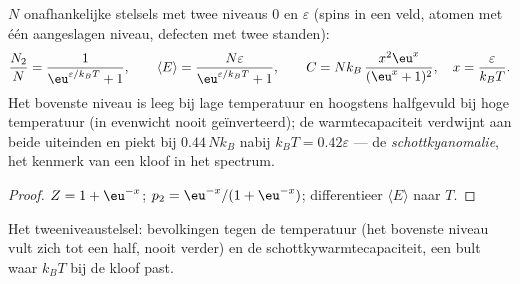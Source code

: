 \begin{proposition}[Tweeniveaustelsel]\label{prop:b2:boltzmann-factor:twolevel}
$N$ onafhankelijke stelsels met twee niveaus $0$ en $\varepsilon$ (spins in een
veld, atomen met één aangeslagen niveau, defecten met twee standen):
\[
\frac{N_2}{N} = \frac{1}{\eu^{\varepsilon/k_BT} + 1}, \qquad
\langle E\rangle = \frac{N\varepsilon}{\eu^{\varepsilon/k_BT} + 1}, \qquad
C = Nk_B\,\frac{x^2\eu^x}{(\eu^x + 1)^2}, \quad x = \frac{\varepsilon}{k_BT} .
\]
Het bovenste niveau is leeg bij lage temperatuur en hoogstens halfgevuld bij
hoge temperatuur (in evenwicht nooit geïnverteerd); de warmtecapaciteit
verdwijnt aan beide uiteinden en piekt bij $0.44\,Nk_B$ nabij
$k_BT = 0.42
\varepsilon$ --- de \emph{schottkyanomalie}, het
kenmerk van een kloof in het spectrum.
\end{proposition}

\begin{proof}
$Z = 1 + \eu^{-x}$; $p_2 = \eu^{-x}/(1 + \eu^{-x})$; differentieer
$\langle
E\rangle$ naar $T$.
\end{proof}

\begin{omfigure}

{\small Het tweeniveaustelsel: bevolkingen tegen de temperatuur (het
bovenste niveau vult zich tot een half, nooit verder) en de
schottkywarmte\-capaciteit,
een bult waar $k_BT$ bij de kloof past.}
\end{omfigure}

